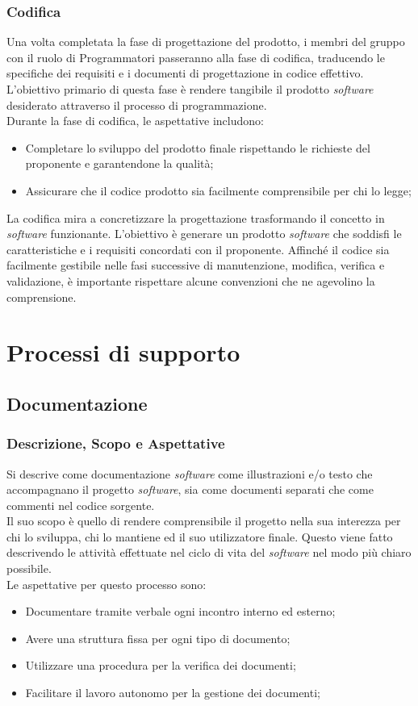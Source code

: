 \documentclass[5pt]{article}
\begin{document}
\subsubsection{Codifica}
Una volta completata la fase di progettazione del prodotto, i membri del gruppo con il ruolo di Programmatori passeranno alla fase di codifica, traducendo le specifiche dei requisiti e i documenti di progettazione in codice effettivo. L'obiettivo primario di questa fase è rendere tangibile il prodotto \textit{software} desiderato attraverso il processo di programmazione.\\
Durante la fase di codifica, le aspettative includono:
\begin{itemize}
    \item Completare lo sviluppo del prodotto finale rispettando le richieste del proponente e garantendone la qualità;
    \item Assicurare che il codice prodotto sia facilmente comprensibile per chi lo legge;
\end{itemize}
La codifica mira a concretizzare la progettazione trasformando il concetto in \textit{software} funzionante. L'obiettivo è generare un prodotto \textit{software} che soddisfi le caratteristiche e i requisiti concordati con il proponente. Affinché il codice sia facilmente gestibile nelle fasi successive di manutenzione, modifica, verifica e validazione, è importante rispettare alcune convenzioni che ne agevolino la comprensione.


\section{Processi di supporto}

\subsection{Documentazione}
\subsubsection{Descrizione, Scopo e Aspettative }
Si descrive come documentazione \textit{software} come illustrazioni e/o testo che accompagnano il progetto \textit{software}, sia come documenti separati che come commenti nel codice sorgente.\\
Il suo scopo è quello di rendere comprensibile il progetto nella sua interezza per chi lo sviluppa, chi lo mantiene ed il suo utilizzatore finale. Questo viene fatto descrivendo le attività effettuate nel ciclo di vita del \textit{software} nel modo più chiaro possibile.\\
Le aspettative per questo processo sono:
\begin{itemize}
    \item Documentare tramite verbale ogni incontro interno ed esterno;
    \item Avere una struttura fissa per ogni tipo di documento;
    \item Utilizzare una procedura per la verifica dei documenti;
    \item Facilitare il lavoro autonomo per la gestione dei documenti;
\end{itemize}
\end{document}
